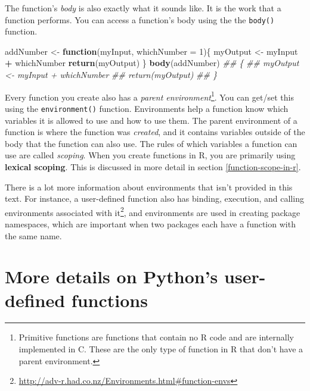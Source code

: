 \documentclass[12pt,krantz2]{krantz}
\makeatletter
\newenvironment{Shaded}{\begin{snugshade}}{\end{snugshade}}
\newcommand{\CommentTok}[1]{\textcolor[rgb]{0.37,0.37,0.37}{\textit{#1}}}
\newcommand{\ControlFlowTok}[1]{\textcolor[rgb]{0.27,0.27,0.27}{\textbf{#1}}}
\newcommand{\DataTypeTok}[1]{\textcolor[rgb]{0.27,0.27,0.27}{#1}}
\newcommand{\DecValTok}[1]{\textcolor[rgb]{0.06,0.06,0.06}{#1}}
\newcommand{\KeywordTok}[1]{\textcolor[rgb]{0.27,0.27,0.27}{\textbf{#1}}}
\newcommand{\NormalTok}[1]{#1}
\newcommand{\OperatorTok}[1]{\textcolor[rgb]{0.43,0.43,0.43}{\textbf{#1}}}
\newcommand{\StringTok}[1]{\textcolor[rgb]{0.5,0.5,0.5}{#1}}
\renewcommand{\href}[2]{#2\footnote{\url{#1}}}
\newenvironment{kframe}{%
\medskip{}
\setlength{\fboxsep}{.8em}
 \def\at@end@of@kframe{}%
 \ifinner\ifhmode%
  \def\at@end@of@kframe{\end{minipage}}%
  \begin{minipage}{\columnwidth}%
 \fi\fi%
 \def\FrameCommand##1{\hskip\@totalleftmargin \hskip-\fboxsep
 \colorbox{shadecolor}{##1}\hskip-\fboxsep
     \hskip-\linewidth \hskip-\@totalleftmargin \hskip\columnwidth}%
 \MakeFramed {\advance\hsize-\width
   \@totalleftmargin\z@ \linewidth\hsize
   \@setminipage}}%
 {\par\unskip\endMakeFramed%
 \at@end@of@kframe}
\renewenvironment{Shaded}{\begin{kframe}}{\end{kframe}}
\makeatother
\begin{document}
The function's \emph{body} is also exactly what it sounds like. It is the work that a function performs. You can access a function's body using the the \texttt{body()} function.

\begin{Shaded}
\begin{Highlighting}[]
\NormalTok{addNumber <-}\StringTok{ }\ControlFlowTok{function}\NormalTok{(myInput, }\DataTypeTok{whichNumber =} \DecValTok{1}\NormalTok{)\{  }
\NormalTok{  myOutput <-}\StringTok{ }\NormalTok{myInput }\OperatorTok{+}\StringTok{ }\NormalTok{whichNumber}
  \KeywordTok{return}\NormalTok{(myOutput)}
\NormalTok{\}}
\KeywordTok{body}\NormalTok{(addNumber)}
\CommentTok{## \{}
\CommentTok{##     myOutput <- myInput + whichNumber}
\CommentTok{##     return(myOutput)}
\CommentTok{## \}}
\end{Highlighting}
\end{Shaded}

Every function you create also has a \emph{parent environment}\footnote{Primitive functions are functions that contain no R code and are internally implemented in C. These are the only type of function in R that don't have a parent environment.}. You can get/set this using the \texttt{environment()} function. Environments help a function know which variables it is allowed to use and how to use them. The parent environment of a function is where the function was \emph{created}, and it contains variables outside of the body that the function can also use. The rules of which variables a function can use are called \emph{scoping}. When you create functions in R, you are primarily using \textbf{lexical scoping}. This is discussed in more detail in section \ref{function-scope-in-r}.

\begin{rmd-details}
There is a lot more information about environments that isn't provided in this text. For instance, a user-defined function also has \href{http://adv-r.had.co.nz/Environments.html\#function-envs}{binding, execution, and calling environments associated with it}, and environments are used in creating package namespaces, which are important when two packages each have a function with the same name.

\end{rmd-details}

\hypertarget{more-details-on-pythons-user-defined-functions}{%
\section{More details on Python's user-defined functions}\label{more-details-on-pythons-user-defined-functions}}
\end{document}
